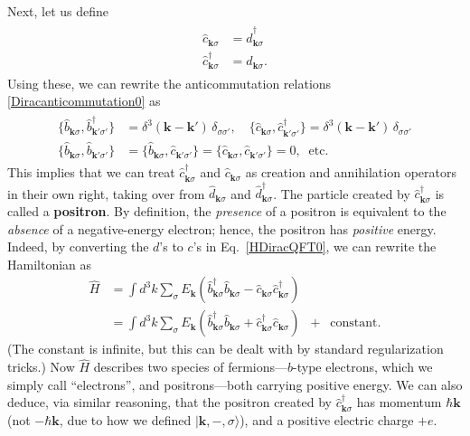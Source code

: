 \documentclass[prx,12pt]{revtex4-2}
\begin{document}
Next, let us define
\begin{align}
  \begin{aligned}
  \hat{c}_{\mathbf{k}\sigma} &= \hat{d}^\dagger_{\mathbf{k}\sigma} \\
  \hat{c}_{\mathbf{k}\sigma}^\dagger &= \hat{d}_{\mathbf{k}\sigma}.
  \end{aligned}
  \label{positron_ops}
\end{align}
Using these, we can rewrite the anticommutation relations
\eqref{Diracanticommutation0} as
\begin{align}
  \begin{aligned}
    \{\hat{b}_{\mathbf{k}\sigma}, \hat{b}_{\mathbf{k}'\sigma'}^\dagger \}
    &= \delta^3(\mathbf{k}-\mathbf{k}') \, \delta_{\sigma\sigma'}, \quad
    \{\hat{c}_{\mathbf{k}\sigma}, \hat{c}_{\mathbf{k}'\sigma'}^\dagger \}
    = \delta^3(\mathbf{k}-\mathbf{k}') \, \delta_{\sigma\sigma'} \\
    \{\hat{b}_{\mathbf{k}\sigma}, \hat{b}_{\mathbf{k}'\sigma'} \} &= 
    \{\hat{b}_{\mathbf{k}\sigma}, \hat{c}_{\mathbf{k}'\sigma'} \} = 
    \{\hat{c}_{\mathbf{k}\sigma}, \hat{c}_{\mathbf{k}'\sigma'} \} = 0, \;\;\textrm{etc.}
  \end{aligned}
  \label{Diracanticommutators}
\end{align}
This implies that we can treat $\hat{c}^\dagger_{\mathbf{k}\sigma}$
and $\hat{c}_{\mathbf{k}\sigma}$ as creation and annihilation
operators in their own right, taking over from
$\hat{d}_{\mathbf{k}\sigma}$ and $\hat{d}_{\mathbf{k}\sigma}^\dagger$.
The particle created by $\hat{c}^\dagger_{\mathbf{k}\sigma}$ is called
a \textbf{positron}.  By definition, the \textit{presence} of a
positron is equivalent to the \textit{absence} of a negative-energy
electron; hence, the positron has \textit{positive} energy.  Indeed,
by converting the $d$'s to $c$'s in Eq.~\eqref{HDiracQFT0}, we can
rewrite the Hamiltonian as
\begin{align}
  \hat{H}   &= \int d^3k \sum_\sigma E_{\mathbf{k}} \left(
  \hat{b}^\dagger_{\mathbf{k}\sigma} \hat{b}_{\mathbf{k}\sigma}
  - \hat{c}_{\mathbf{k}\sigma} \hat{c}^\dagger_{\mathbf{k}\sigma}
  \right) \\
  &= \int d^3k \sum_\sigma E_{\mathbf{k}} \left(
  \hat{b}^\dagger_{\mathbf{k}\sigma} \hat{b}_{\mathbf{k}\sigma}
  + \hat{c}^\dagger_{\mathbf{k}\sigma} \hat{c}_{\mathbf{k}\sigma}
  \right) \;\; + \;\; \textrm{constant}.
  \label{HDiracQFT}
\end{align}
(The constant is infinite, but this can be dealt with by standard
regularization tricks.)  Now $\hat{H}$ describes two species of
fermions---$b$-type electrons, which we simply call ``electrons'', and
positrons---both carrying positive energy.  We can also deduce, via
similar reasoning, that the positron created by
$\hat{c}^\dagger_{\mathbf{k}\sigma}$ has momentum $\hbar \mathbf{k}$
(not $-\hbar \mathbf{k}$, due to how we defined $|\mathbf{k}, -,
\sigma\rangle$), and a positive electric charge $+e$.
\end{document}
